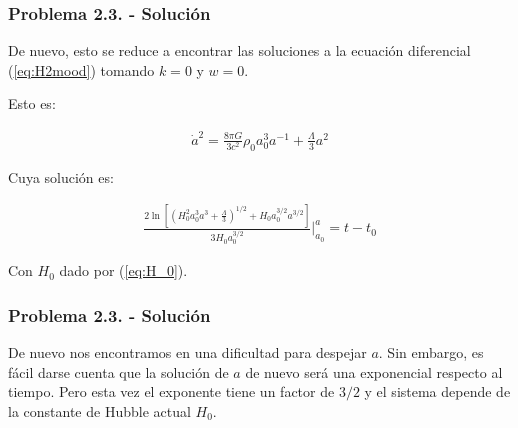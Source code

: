 \begin{frame}
    \frametitle{Problema 2.3. - Solución}

    De nuevo, esto se reduce a encontrar las soluciones a la ecuación diferencial (\ref{eq:H2mood}) tomando $k=0$ y $w=0$.

    Esto es:

    \begin{align*}
        \dot{a}^2 = \frac{8\pi G}{3c^2}\rho_0 a_0^{3}a^{-1}+\frac{\Lambda}{3}a^2
    \end{align*}

    Cuya solución es:

    \begin{align*}
        \frac{2\ln\left[\left(H_0^2a_0^3a^3+\frac{\Lambda}{3}\right)^{1/2}+H_0a_0^{3/2}a^{3/2}\right]}{3H_0a_0^{3/2}}\Bigg\lvert_{a_0}^{a} = t - t_0
    \end{align*}

    Con $H_0$ dado por (\ref{eq:H_0}).

\end{frame}


\begin{frame}
    \frametitle{Problema 2.3. - Solución}

    De nuevo nos encontramos en una dificultad para despejar $a$. Sin embargo, es fácil darse cuenta que la solución de $a$ de nuevo será una exponencial respecto al tiempo. Pero esta vez el exponente tiene un factor de $3/2$ y el sistema depende de la constante de Hubble actual $H_0$.

\end{frame}